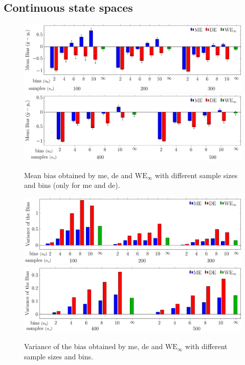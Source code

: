 \subsection{Continuous state spaces}
\begin{figure}
 \begin{minipage}{.99\columnwidth}
 \centering
  \includegraphics[width=\textwidth]{./img/MM_123_new_noabs.pdf}\\
  \includegraphics[width=\textwidth]{./img/MM_45_new_noabs.pdf}
 \end{minipage}
  \caption[Bias in pricing problem]{Mean bias obtained by \gls{me}, \gls{de} and $\text{WE}_{\infty}$ with different sample sizes and bins (only for \gls{me} and \gls{de}).
  }
  \label{F:pricing_bias}
\end{figure}
\begin{figure}[t]
 \begin{minipage}{.99\columnwidth}
 \centering
  \includegraphics[width=\textwidth]{./img/MM_123_new_var.pdf}\\
  \includegraphics[width=\textwidth]{./img/MM_45_new_var.pdf}
 \end{minipage}
  \caption[Variance in pricing problem]{Variance of the bias obtained by \gls{me}, \gls{de} and $\text{WE}_{\infty}$ with different sample sizes and bins.
  }
  \label{F:pricing_variance}
\end{figure}
